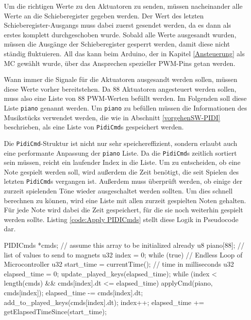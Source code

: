 Um die richtigen Werte zu den Aktuatoren zu senden, müssen nacheinander alle Werte an die Schieberegister gegeben werden.
Der Wert des letzten Schieberegister-Ausgangs muss dabei zuerst gesendet werden, da es dann als erstes komplett durchgeschoben wurde.
Sobald alle Werte ausgesandt wurden, müssen die Ausgänge der Schieberegister gesperrt werden, damit diese nicht ständig fluktuieren.
All das kann beim Arduino, der in Kapitel \ref{Ansteuerung} als \ac{MC} gewählt wurde, über das Ansprechen spezieller \ac{PWM}-Pins getan werden.


Wann immer die Signale für die Aktuatoren ausgesandt werden sollen, müssen diese Werte vorher bereitstehen.
Da 88 Aktuatoren angesteuert werden sollen, muss also eine Liste von 88 \ac{PWM}-Werten befüllt werden.
Im Folgenden soll diese Liste \lstinline{piano} genannt werden.
Um \lstinline{piano} zu befüllen müssen die Informationen des Musikstücks verwendet werden, die wie in Abschnitt \ref{vorgehenSW-PIDI} beschrieben, als eine Liste von \lstinline{PidiCmd}s gespeichert werden.

Die \lstinline{PidiCmd}-Struktur ist nicht nur sehr speichereffizient, sondern erlaubt auch eine performante Anpassung der \lstinline{piano} Liste.
Da die \lstinline{PidiCmd}s zeitlich sortiert sein müssen, reicht ein laufender Index in die Liste.
Um zu entscheiden, ob eine Note gespielt werden soll, wird außerdem die Zeit benötigt, die seit Spielen des letzten \lstinline{PidiCmd}s vergangen ist.
Außerdem muss überprüft werden, ob einige der zurzeit spielenden Töne wieder ausgeschaltet werden sollten.
Um dies schnell berechnen zu können, wird eine Liste mit allen zurzeit gespielten Noten gehalten.
Für jede Note wird dabei die Zeit gespeichert, für die sie noch weiterhin gespielt werden sollte.
Listing \ref{code:Apply PIDICmds} stellt diese Logik in Pseudocode dar.

\begin{UnbrokenCodePage}[style=CStyle, caption={Nutzung der \lstinline{PidiCmd}-Struktur}, label={code:Apply PIDICmds}]
PIDICmds *cmds; // assume this array to be initialized already
u8  piano[88];  // list of values to send to magnets
u32 index = 0;
while (true) {  // Endless Loop of Microcontroller
    u32 start_time   = currentTime(); // time in milliseconds
    u32 elapsed_time = 0;
    update_played_keys(elapsed_time);
    while (index < length(cmds) && cmds[index].dt <= elapsed_time) {
        applyCmd(piano, cmds[index]);
        elapsed_time -= cmds[index].dt;
        add_to_played_keys(cmds[index].dt);
        index++;
    }
    elapsed_time += getElapsedTimeSince(start_time);
}
\end{UnbrokenCodePage}

